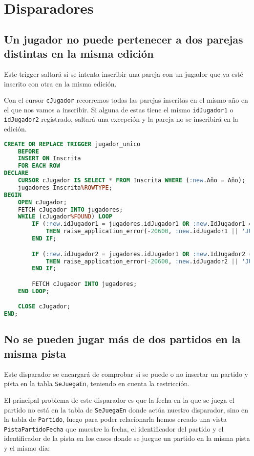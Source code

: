 \section{Disparadores}

\subsection{Un jugador no puede pertenecer a dos parejas distintas en la misma edición}
Este trigger saltará si se intenta inscribir una pareja con un jugador que ya esté
inscrito con otra en la misma edición.

Con el cursor \texttt{cJugador} recorremos todas las parejas inscritas en el
mismo año en el que nos vamos a inscribir. Si alguna de estas tiene el mismo
\texttt{idJugador1} o \texttt{idJugador2} registrado, saltará una excepción y
la pareja no se inscribirá en la edición.

\begin{lstlisting}[language=sql]
CREATE OR REPLACE TRIGGER jugador_unico
	BEFORE
	INSERT ON Inscrita
	FOR EACH ROW
DECLARE
	CURSOR cJugador IS SELECT * FROM Inscrita WHERE (:new.Año = Año);
	jugadores Inscrita%ROWTYPE;
BEGIN
	OPEN cJugador;
	FETCH cJugador INTO jugadores;
	WHILE (cJugador%FOUND) LOOP
		IF (:new.idJugador1 = jugadores.idJugador1 OR :new.IdJugador1 = jugadores.idJugador2)
			THEN raise_application_error(-20600, :new.idJugador1 || 'JUGADOR 1: No se puede pertenecer a más de una pareja en la misma edicion');
		END IF;

		IF (:new.idJugador2 = jugadores.idJugador1 OR :new.IdJugador2 = jugadores.idJugador2)
			THEN raise_application_error(-20600, :new.idJugador2 || 'JUGADOR 2: No se puede pertenecer a más de una pareja en la misma edicion');
		END IF;

		FETCH cJugador INTO jugadores;
	END LOOP;

	CLOSE cJugador;
END;
\end{lstlisting}

\subsection{No se pueden jugar más de dos partidos en la misma pista}
Este disparador se encargará de comprobar si se puede o no insertar un partido
y pista en la tabla \texttt{SeJuegaEn}, teniendo en cuenta la restricción.

El principal problema de este disparador es que la fecha en la que se juega el
partido no está en la tabla de \texttt{SeJuegaEn} donde actúa nuestro disparador,
sino en la tabla de \texttt{Partido}, luego para poder relacionarla hemos creado
una vista \texttt{PistaPartidoFecha} que muestre la fecha, el identificador del
partido y el identificador de la pista en los casos donde se juegue un partido en
la misma pista y el mismo día:

